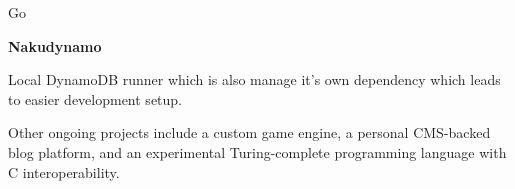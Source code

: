 \documentclass[10pt]{article}
\begin{document}
\begin{minipage}{\textwidth}


        \vspace{0.85em}

        \begin{minipage}{0.85\textwidth}
            \normalsize
            \begingroup
                Go\par
                \textbf{Nakudynamo}\par
            \endgroup
        \end{minipage}
        \hfill
        \begin{minipage}{0.04\textwidth}
            \normalsize
            \endgroup
        \end{minipage}

        \vspace{0.35em}
        \begin{minipage}{0.993\textwidth}
            \normalsize
            \begingroup
            Local DynamoDB runner which is also manage it's own dependency which leads to easier development setup.
            \endgroup
        \end{minipage}

        \vspace{0.85em}
        \begin{minipage}{0.993\textwidth}
            \normalsize
            \begingroup
            Other ongoing projects include a custom game engine, a personal CMS-backed blog platform, and an experimental Turing-complete programming language with C interoperability.
            \endgroup
        \end{minipage}
    \end{minipage}
\end{document}
